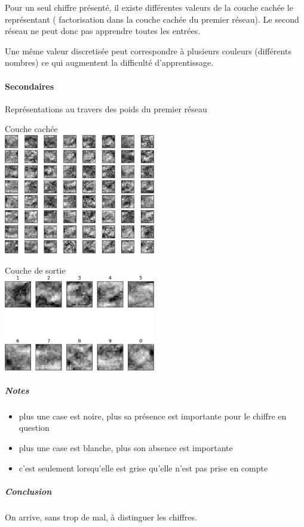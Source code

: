 	Pour un seul chiffre présenté, il existe différentes valeurs de la couche cachée le représentant ( factorisation 
	dans la couche cachée du premier réseau). Le second réseau ne peut donc pas apprendre toutes les entrées.
	
	Une même valeur discretisée peut correspondre à plusieurs couleurs (différents nombres) ce qui augmentent la 
	difficulté d'apprentissage.
    \paragraph{Secondaires}
      Représentations au travers des poids du premier réseau
      \begin{center}
	Couche cachée \\
	\includegraphics[width=250px]{data/expA3/representation_hidden.png}
      \end{center}
      \begin{center}
	Couche de sortie \\
	\includegraphics[width=250px]{data/expA3/representation.png}
      \end{center} 
      \subparagraph{Notes}
	\begin{itemize}
	  \item plus une case est noire, plus sa présence est importante pour le chiffre en question
	  \item plus une case est blanche, plus son absence est importante
	  \item c'est seulement lorsqu'elle est grise qu'elle n'est pas prise en compte
	\end{itemize}
      \subparagraph{Conclusion}
	On arrive, sans trop de mal, à distinguer les chiffres.
